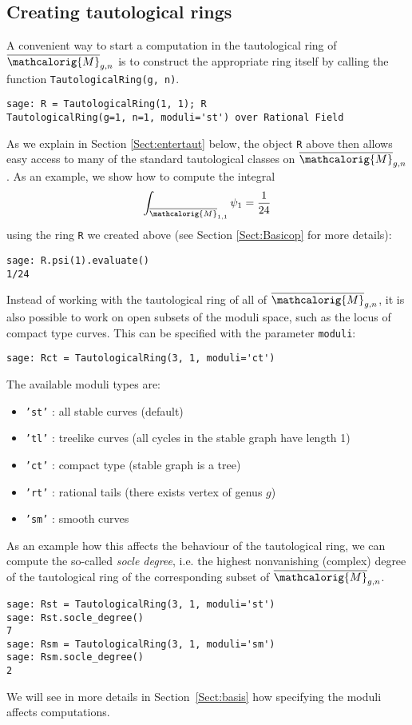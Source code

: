 \documentclass[11pt]{article}
\newcommand{\M}{\ensuremath{\overline{\mathcalorig{M}}}}
\begin{document}
\subsection{Creating tautological rings} \label{Sect:ring}
A convenient way to start a computation in the tautological ring of $\M_{g,n}$ is to construct the appropriate ring itself by calling the function \verb|TautologicalRing(g, n)|.
\begin{lstlisting}
sage: R = TautologicalRing(1, 1); R
TautologicalRing(g=1, n=1, moduli='st') over Rational Field
\end{lstlisting}
As we explain in Section \ref{Sect:entertaut} below, the object \texttt{R} above then allows easy access to many of the standard tautological classes on $\M_{g,n}$. As an example, we show how to compute the integral
\[
\int_{\M_{1,1}} \psi_1 = \frac{1}{24}
\]
using the ring \texttt{R} we created above (see Section \ref{Sect:Basicop} for more details):
\begin{lstlisting}
sage: R.psi(1).evaluate()
1/24
\end{lstlisting}
Instead of working with the tautological ring of all of $\M_{g,n}$, it is also possible to work on open subsets of the moduli space, such as the locus of compact type curves. This can be specified with the parameter \texttt{moduli}:
\begin{lstlisting}
sage: Rct = TautologicalRing(3, 1, moduli='ct')
\end{lstlisting}
The available moduli types are:
\begin{itemize}
    \item \texttt{'st'} : all stable curves (default)
    \item \texttt{'tl'} : treelike curves (all cycles in the stable graph have length 1)
    \item \texttt{'ct'} : compact type (stable graph is a tree)
    \item \texttt{'rt'} : rational tails (there exists vertex of genus $g$)
    \item \texttt{'sm'} : smooth curves
\end{itemize}
As an example how this affects the behaviour of the tautological ring, we can compute the so-called \emph{socle degree}, i.e. the highest nonvanishing (complex) degree of the tautological ring of the corresponding subset of $\M_{g,n}$.
\begin{lstlisting}
sage: Rst = TautologicalRing(3, 1, moduli='st')
sage: Rst.socle_degree()
7
sage: Rsm = TautologicalRing(3, 1, moduli='sm')
sage: Rsm.socle_degree()
2
\end{lstlisting}
We will see in more details in Section~\ref{Sect:basis} how specifying the moduli affects computations.
\end{document}
